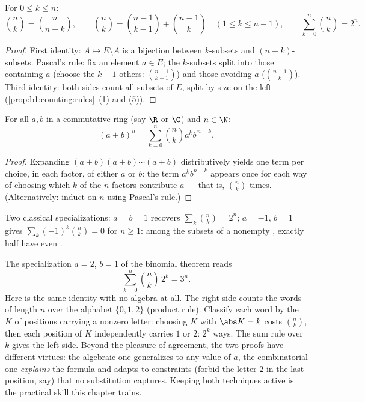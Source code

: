 \begin{proposition}\label{prop:b1:counting:identities}
For $0 \leq k \leq n$:
\[
\binom{n}{k} = \binom{n}{n-k},
\qquad
\binom{n}{k} = \binom{n-1}{k-1} + \binom{n-1}{k}
\quad (1 \leq k \leq n-1),
\qquad
\sum_{k=0}^{n} \binom{n}{k} = 2^n .
\]
\end{proposition}

\begin{proof}
First identity: $A \mapsto E \setminus A$ is a bijection between
$k$-subsets and $(n-k)$-subsets. Pascal's rule:
fix an element $a \in E$; the $k$-subsets split into those containing
$a$ (choose the $k - 1$ others: $\binom{n-1}{k-1}$) and those avoiding
$a$ ($\binom{n-1}{k}$). Third identity: both sides count all subsets
of $E$, split by size on the left
(\cref{prop:b1:counting:rules}~(1) and (5)).
\end{proof}

\begin{theorem}\label{thm:b1:counting:binomial}
For all $a, b$ in a commutative ring (say $\R$ or $\C$) and $n \in \N$:
\[
(a + b)^n = \sum_{k=0}^{n} \binom{n}{k} a^k b^{\,n-k} .
\]
\end{theorem}

\begin{proof}
Expanding $(a+b)(a+b)\cdots(a+b)$ distributively yields one term per
choice, in each factor, of either $a$ or $b$: the term $a^k b^{n-k}$
appears once for each way of choosing which $k$ of the $n$ factors
contribute $a$ --- that is, $\binom nk$ times. (Alternatively: induct
on $n$ using Pascal's rule.)
\end{proof}

\begin{example}\label{ex:b1:counting:binomial}
Two classical specializations: $a = b = 1$ recovers $\sum_k \binom nk
= 2^n$; $a = -1$, $b = 1$ gives $\sum_{k} (-1)^k \binom nk = 0$ for
$n \geq 1$: among the subsets of a nonempty , exactly half have
even .
\end{example}

\begin{example}\label{ex:b1:counting:threen}
The specialization $a = 2$, $b = 1$ of the binomial theorem reads
\[
\sum_{k=0}^{n} \binom nk\,2^k = 3^n .
\]
Here is the same identity with no algebra at all. The right side
counts the words of length $n$ over the alphabet $\{0, 1, 2\}$
(product rule). Classify each word by the  $K$ of positions
carrying a nonzero letter: choosing $K$ with $\abs K = k$ costs
$\binom nk$, then each position of $K$ independently carries $1$
or $2$: $2^k$ ways. The sum rule over $k$ gives the left side.
Beyond the pleasure of agreement, the two proofs have different
virtues: the algebraic one generalizes to any value of $a$, the
combinatorial one \emph{explains} the formula and adapts to
constraints (forbid the letter $2$ in the last position, say) that
no substitution captures. Keeping both techniques active is the
practical skill this chapter trains.
\end{example}

